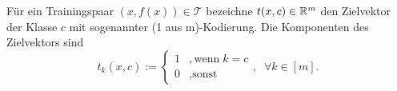 Für ein Trainingspaar $(x,f(x)) \in \mathcal{T}$ bezeichne $t(x,c) \in \mathbb{R}^m$ den Zielvektor der Klasse $c$ mit sogenannter (1 aus m)-Kodierung. Die Komponenten des Zielvektors sind
\begin{equation*}
    t_k(x,c):= \begin{cases}
        1 &, \text{wenn} \; k=c \\
        0 &, \text{sonst}
    \end{cases}, \; \; \forall k \in [m].
\end{equation*} 


